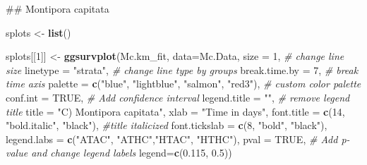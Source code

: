 \documentclass[]{article}
\newenvironment{Shaded}{\begin{snugshade}}{\end{snugshade}}
\newcommand{\KeywordTok}[1]{\textcolor[rgb]{0.13,0.29,0.53}{\textbf{#1}}}
\newcommand{\DataTypeTok}[1]{\textcolor[rgb]{0.13,0.29,0.53}{#1}}
\newcommand{\DecValTok}[1]{\textcolor[rgb]{0.00,0.00,0.81}{#1}}
\newcommand{\FloatTok}[1]{\textcolor[rgb]{0.00,0.00,0.81}{#1}}
\newcommand{\StringTok}[1]{\textcolor[rgb]{0.31,0.60,0.02}{#1}}
\newcommand{\CommentTok}[1]{\textcolor[rgb]{0.56,0.35,0.01}{\textit{#1}}}
\newcommand{\OtherTok}[1]{\textcolor[rgb]{0.56,0.35,0.01}{#1}}
\newcommand{\NormalTok}[1]{#1}
\begin{document}
\begin{Shaded}
\begin{Highlighting}[]
\NormalTok{## Montipora capitata}

\NormalTok{splots <-}\StringTok{ }\KeywordTok{list}\NormalTok{()}

\NormalTok{splots[[}\DecValTok{1}\NormalTok{]] <-}\StringTok{ }\KeywordTok{ggsurvplot}\NormalTok{(Mc.km_fit, }\DataTypeTok{data=}\NormalTok{Mc.Data, }\DataTypeTok{size =} \DecValTok{1}\NormalTok{,  }\CommentTok{# change line size}
           \DataTypeTok{linetype =} \StringTok{"strata"}\NormalTok{, }\CommentTok{# change line type by groups}
           \DataTypeTok{break.time.by =} \DecValTok{7}\NormalTok{, }\CommentTok{# break time axis}
           \DataTypeTok{palette =} \KeywordTok{c}\NormalTok{(}\StringTok{"blue"}\NormalTok{, }\StringTok{"lightblue"}\NormalTok{, }\StringTok{"salmon"}\NormalTok{, }\StringTok{"red3"}\NormalTok{), }\CommentTok{# custom color palette}
           \DataTypeTok{conf.int =} \OtherTok{TRUE}\NormalTok{, }\CommentTok{# Add confidence interval}
           \DataTypeTok{legend.title =} \StringTok{""}\NormalTok{, }\CommentTok{# remove legend title}
           \DataTypeTok{title =} \StringTok{"C) Montipora capitata"}\NormalTok{,}
           \DataTypeTok{xlab =} \StringTok{"Time in days"}\NormalTok{,}
           \DataTypeTok{font.title =} \KeywordTok{c}\NormalTok{(}\DecValTok{14}\NormalTok{, }\StringTok{"bold.italic"}\NormalTok{, }\StringTok{"black"}\NormalTok{), }\CommentTok{#title italicized}
           \DataTypeTok{font.tickslab =} \KeywordTok{c}\NormalTok{(}\DecValTok{8}\NormalTok{, }\StringTok{"bold"}\NormalTok{, }\StringTok{"black"}\NormalTok{),}
           \DataTypeTok{legend.labs =} \KeywordTok{c}\NormalTok{(}\StringTok{"ATAC"}\NormalTok{, }\StringTok{"ATHC"}\NormalTok{,}\StringTok{"HTAC"}\NormalTok{, }\StringTok{"HTHC"}\NormalTok{), }\DataTypeTok{pval =} \OtherTok{TRUE}\NormalTok{, }\CommentTok{# Add p-value and change legend labels}
           \DataTypeTok{legend=}\KeywordTok{c}\NormalTok{(}\FloatTok{0.115}\NormalTok{, }\FloatTok{0.5}\NormalTok{))}



\end{Highlighting}
\end{Shaded}
\end{document}
